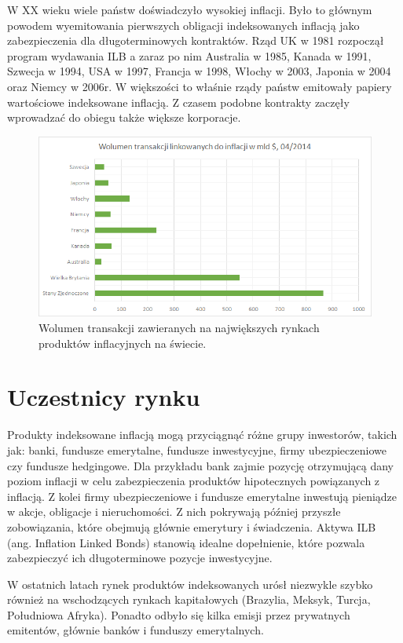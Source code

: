 \documentclass{mini}
\theoremstyle{mythstyle}
\begin{document}
	W XX wieku wiele państw doświadczyło wysokiej inflacji. Było to głównym powodem wyemitowania pierwszych obligacji indeksowanych inflacją jako zabezpieczenia dla długoterminowych kontraktów. Rząd UK w 1981 rozpoczął program wydawania ILB a zaraz po nim Australia w 1985, Kanada w 1991, Szwecja w 1994, USA w 1997, Francja w 1998, Włochy w 2003, Japonia w 2004 oraz Niemcy w 2006r. W większości to właśnie rządy państw emitowały papiery wartościowe indeksowane inflacją. Z czasem podobne kontrakty zaczęły wprowadzać do obiegu także większe korporacje.
	\begin{figure} [h]
		\centering
		\includegraphics[scale=0.8]{graphics/wolumen.png}
		\caption{Wolumen transakcji zawieranych na największych rynkach produktów inflacyjnych na świecie.}
	\end{figure}
	\section{Uczestnicy rynku}
		
	Produkty indeksowane inflacją mogą przyciągnąć różne grupy inwestorów, takich jak: banki, fundusze emerytalne, fundusze inwestycyjne, firmy ubezpieczeniowe czy fundusze hedgingowe. Dla przykładu bank zajmie pozycję otrzymującą dany poziom inflacji w celu zabezpieczenia produktów hipotecznych powiązanych z inflacją. Z kolei firmy ubezpieczeniowe i fundusze emerytalne inwestują pieniądze w akcje, obligacje i nieruchomości. Z nich pokrywają później przyszłe zobowiązania, które obejmują głównie emerytury i świadczenia. Aktywa ILB (ang. Inflation Linked Bonds) stanowią idealne dopełnienie, które pozwala zabezpieczyć ich długoterminowe pozycje inwestycyjne.

	W ostatnich latach rynek produktów indeksowanych urósł niezwykle szybko również na wschodzących rynkach kapitałowych (Brazylia, Meksyk, Turcja, Południowa Afryka). Ponadto odbyło się kilka emisji przez prywatnych emitentów, głównie banków i funduszy emerytalnych.
\end{document}
